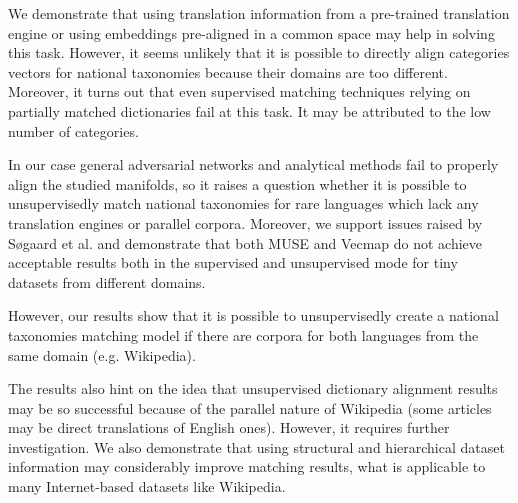 \documentclass[11pt,a4paper]{article}
\begin{document}
We demonstrate that using translation information from a pre-trained translation engine or using embeddings pre-aligned in a common space may help in solving this task. However, it seems unlikely that it is possible to directly align categories vectors for national taxonomies because their domains are too different. Moreover, it turns out that even supervised matching techniques relying on partially matched dictionaries fail at this task. It may be attributed to the low number of categories.

In our case general adversarial networks and analytical methods fail to properly align the studied manifolds, so it raises a question whether it is possible to unsupervisedly match national taxonomies for rare languages which lack any translation engines or parallel corpora. Moreover, we support issues raised by Søgaard et al. \cite{ruder-muse-limitations} and demonstrate that both MUSE and Vecmap do not achieve acceptable results both in the supervised and unsupervised mode for tiny datasets from different domains.

However, our results show that it is possible to unsupervisedly create a national taxonomies matching model if there are corpora for both languages from the same domain (e.g. Wikipedia).

The results also hint on the idea that unsupervised dictionary alignment results may be so successful because of the parallel nature of Wikipedia (some articles may be direct translations of English ones). However, it requires further investigation.
We also demonstrate that using structural and hierarchical dataset information may considerably improve matching results, what is applicable to many Internet-based datasets like Wikipedia.



\end{document}
